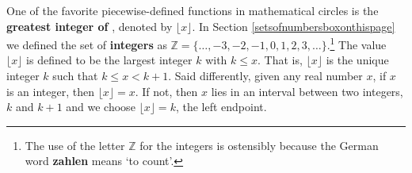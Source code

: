 \documentclass{ximera}
\begin{document}
\begin{example}
\begin{explanation}
\begin{enumerate}
\begin{center}


\end{center}

\end{enumerate}

\end{explanation}

\end{example}

One of the favorite piecewise-defined functions in mathematical circles is the  \textbf{greatest integer of }, denoted by $\lfloor x \rfloor$. In Section \ref{setsofnumbersboxonthispage} we defined the set of \textbf{integers} as  $\mathbb{Z} = \{ \ldots, -3, -2, -1, 0, 1, 2, 3, \ldots\}$.\footnote{The use of the letter $\mathbb{Z}$ for the integers is ostensibly because the German word \textbf{zahlen} means `to count'.}  The value $\lfloor x \rfloor$  is defined to be the largest integer $k$ with $k \leq x$.  That is, $\lfloor x \rfloor$ is the unique integer $k$ such that $k \leq  x < k+1$.  Said differently, given any real number $x$, if $x$ is an integer, then  $\lfloor x \rfloor = x$.  If not, then $x$ lies in an interval between two integers, $k$ and $k+1$ and we choose  $\lfloor x \rfloor = k$, the left endpoint.
\end{document}
